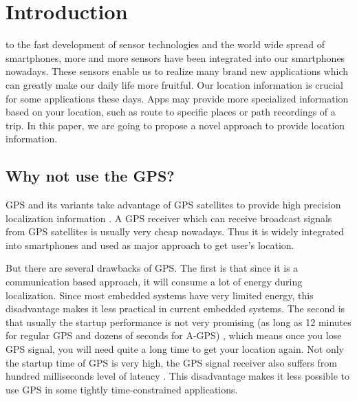 \documentclass[journal]{IEEEtran}
\begin{document}
\section{Introduction}
 to the fast development of sensor technologies and the world wide spread of smartphones, more and more sensors have been integrated into our smartphones nowadays. 
These sensors enable us to realize many brand new applications which can greatly make our daily life more fruitful. 
Our location information is crucial for some applications these days. 
Apps may provide more specialized information based on your location, such as route to specific places or path recordings of a trip.
In this paper, we are going to propose a novel approach to provide location information.

\subsection{Why not use the GPS?}
GPS and its variants take advantage of GPS satellites to provide high precision localization information \cite{GPS}. 
A GPS receiver which can receive broadcast signals from GPS satellites is usually very cheap nowadays. 
Thus it is widely integrated into smartphones and used as major approach to get user's location. 

But there are several drawbacks of GPS.
The first is that since it is a communication based approach, it will consume a lot of energy during localization. 
Since most embedded systems have very limited energy, this disadvantage makes it less practical in current embedded systems.
The second is that usually the startup performance is not very promising (as long as 12 minutes for regular GPS and dozens of seconds for A-GPS) \cite{A-GPS}, which means once you lose GPS signal, you will need quite a long time to get your location again. 
Not only the startup time of GPS is very high, the GPS signal receiver also suffers from hundred milliseconds level of latency \cite{GPS Latency}.
This disadvantage makes it less possible to use GPS in some tightly time-constrained applications. 
\end{document}
